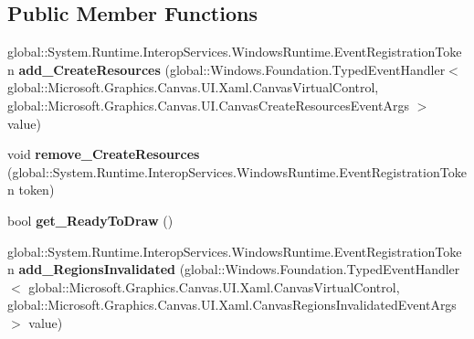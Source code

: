 \subsection*{Public Member Functions}
\begin{DoxyCompactItemize}
\item 
\mbox{\label{interface_microsoft_1_1_graphics_1_1_canvas_1_1_u_i_1_1_xaml_1_1_i_canvas_virtual_control_a07dc4062e5aad8e7a25c912a888eb205}} 
global\+::\+System.\+Runtime.\+Interop\+Services.\+Windows\+Runtime.\+Event\+Registration\+Token {\bfseries add\+\_\+\+Create\+Resources} (global\+::\+Windows.\+Foundation.\+Typed\+Event\+Handler$<$ global\+::\+Microsoft.\+Graphics.\+Canvas.\+U\+I.\+Xaml.\+Canvas\+Virtual\+Control, global\+::\+Microsoft.\+Graphics.\+Canvas.\+U\+I.\+Canvas\+Create\+Resources\+Event\+Args $>$ value)
\item 
\mbox{\label{interface_microsoft_1_1_graphics_1_1_canvas_1_1_u_i_1_1_xaml_1_1_i_canvas_virtual_control_af71d0732162524cbb84e8775794f761d}} 
void {\bfseries remove\+\_\+\+Create\+Resources} (global\+::\+System.\+Runtime.\+Interop\+Services.\+Windows\+Runtime.\+Event\+Registration\+Token token)
\item 
\mbox{\label{interface_microsoft_1_1_graphics_1_1_canvas_1_1_u_i_1_1_xaml_1_1_i_canvas_virtual_control_ad0524adf9910c3dfd2d10699b71f28d0}} 
bool {\bfseries get\+\_\+\+Ready\+To\+Draw} ()
\item 
\mbox{\label{interface_microsoft_1_1_graphics_1_1_canvas_1_1_u_i_1_1_xaml_1_1_i_canvas_virtual_control_a7d37fb0b34072ecd8bc9f32712ea4cba}} 
global\+::\+System.\+Runtime.\+Interop\+Services.\+Windows\+Runtime.\+Event\+Registration\+Token {\bfseries add\+\_\+\+Regions\+Invalidated} (global\+::\+Windows.\+Foundation.\+Typed\+Event\+Handler$<$ global\+::\+Microsoft.\+Graphics.\+Canvas.\+U\+I.\+Xaml.\+Canvas\+Virtual\+Control, global\+::\+Microsoft.\+Graphics.\+Canvas.\+U\+I.\+Xaml.\+Canvas\+Regions\+Invalidated\+Event\+Args $>$ value)
\item 
\mbox{\label{interface_microsoft_1_1_graphics_1_1_canvas_1_1_u_i_1_1_xaml_1_1_i_canvas_virtual_control_afe949e744dadc9f5e39dfec072c67406}} 

\end{DoxyCompactItemize}
